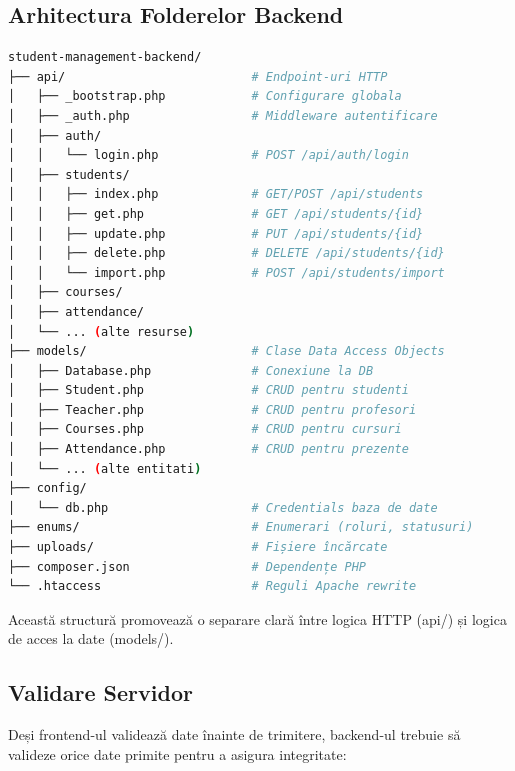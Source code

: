 \subsection{Arhitectura Folderelor Backend}

\begin{lstlisting}[language=bash]
student-management-backend/
├── api/                          # Endpoint-uri HTTP
│   ├── _bootstrap.php            # Configurare globala
│   ├── _auth.php                 # Middleware autentificare
│   ├── auth/
│   │   └── login.php             # POST /api/auth/login
│   ├── students/
│   │   ├── index.php             # GET/POST /api/students
│   │   ├── get.php               # GET /api/students/{id}
│   │   ├── update.php            # PUT /api/students/{id}
│   │   ├── delete.php            # DELETE /api/students/{id}
│   │   └── import.php            # POST /api/students/import
│   ├── courses/
│   ├── attendance/
│   └── ... (alte resurse)
├── models/                       # Clase Data Access Objects
│   ├── Database.php              # Conexiune la DB
│   ├── Student.php               # CRUD pentru studenti
│   ├── Teacher.php               # CRUD pentru profesori
│   ├── Courses.php               # CRUD pentru cursuri
│   ├── Attendance.php            # CRUD pentru prezente
│   └── ... (alte entitati)
├── config/
│   └── db.php                    # Credentials baza de date
├── enums/                        # Enumerari (roluri, statusuri)
├── uploads/                      # Fișiere încărcate
├── composer.json                 # Dependențe PHP
└── .htaccess                     # Reguli Apache rewrite
\end{lstlisting}

Această structură promovează o separare clară între logica HTTP (api/) și logica de acces la date (models/).

\subsection{Validare Servidor}

Deși frontend-ul validează date înainte de trimitere, backend-ul trebuie să valideze orice date primite pentru a asigura integritate:

